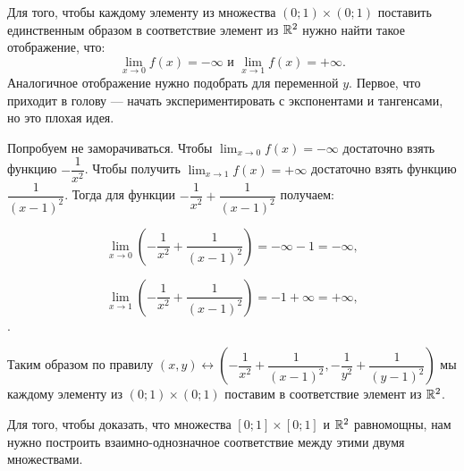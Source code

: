\begin{solution}{1.5}
Для того, чтобы каждому элементу из множества $(0;1) \times (0;1)$ поставить единственным образом в соответствие элемент из $\mathbb R^{2}$ нужно найти такое отображение, что:
\[ \lim_{x \to 0} f(x) = - \infty \text{ и } \lim_{x \to 1} f(x) = + \infty.\] Аналогичное отображение нужно подобрать для переменной $y$. Первое, что приходит в голову --- начать экспериментировать с экспонентами и тангенсами, но это плохая идея.

Попробуем не заморачиваться. Чтобы $\lim_{x \to 0} f(x) = - \infty$ достаточно взять функцию $-\dfrac{1}{x^2}$. Чтобы получить  $\lim_{x \to 1} f(x) = + \infty$ достаточно взять функцию $\dfrac{1}{(x-1)^2}$. Тогда для функции $-\dfrac{1}{x^2} + \dfrac{1}{(x-1)^2}$ получаем:

\[\lim_{x \to 0} \left(-\frac{1}{x^2} + \dfrac{1}{(x-1)^2}\right) = -\infty -1 = -\infty,\]

\[\lim_{x \to 1} \left(-\frac{1}{x^2} + \dfrac{1}{(x-1)^2}\right) = -1 + \infty = +\infty,\].

Таким образом по правилу $(x,y) \leftrightarrow \left(-\dfrac{1}{x^2} + \dfrac{1}{(x-1)^2},-\dfrac{1}{y^2} + \dfrac{1}{(y-1)^2}\right)$ мы каждому элементу из $(0;1) \times (0;1)$ поставим в соответствие элемент из $\mathbb R^{2}$.

Для того, чтобы доказать, что множества $[0;1] \times [0;1]$ и $\mathbb R^{2}$ равномощны, нам нужно построить взаимно-однозначное соответствие между этими двумя множествами.


\end{solution}

